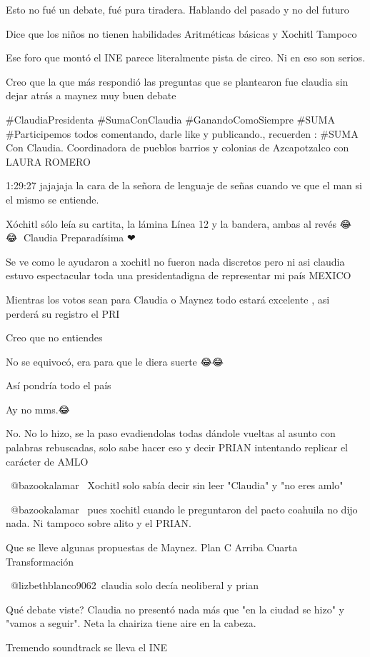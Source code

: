 Esto no fué un debate, fué pura tiradera. Hablando del pasado y no del futuro

Dice que los niños no tienen habilidades Aritméticas básicas y Xochitl Tampoco

Ese foro que montó el INE parece literalmente pista de circo.
Ni en eso son serios.

Creo que la que más respondió las preguntas que se plantearon fue claudia sin dejar atrás a maynez muy buen debate 👌🏻

#ClaudiaPresidenta 
#SumaConClaudia
#GanandoComoSiempre
#SUMA
#Participemos todos comentando, darle like y publicando., recuerden : #SUMA Con Claudia. 
Coordinadora de pueblos barrios y colonias de Azcapotzalco con LAURA ROMERO

1:29:27 jajajaja la cara de la señora de lenguaje de señas cuando ve que el man si el mismo se entiende.

Xóchitl sólo leía su cartita, la lámina Línea 12 y la bandera, ambas al revés 😂🤣😂🤣
Claudia Preparadísima ❤🔬🔭😍

Se ve como le ayudaron a xochitl  no fueron nada discretos pero ni asi claudia estuvo espectacular toda una presidentadigna de representar mi país MEXICO

Mientras los votos sean para Claudia o Maynez todo estará excelente , asi perderá su registro el PRI

Creo que no entiendes

No se equivocó, era para que le diera suerte 😂😂

Así pondría todo el país

Ay no mms.😂

No. No lo hizo, se la paso evadiendolas todas dándole vueltas al asunto con palabras rebuscadas, solo sabe hacer eso y decir PRIAN intentando replicar el carácter de AMLO

​ @bazookalamar  Xochitl solo sabía decir sin leer "Claudia" y "no eres amlo"

 @bazookalamar  pues xochitl cuando le preguntaron del pacto coahuila no dijo nada. Ni tampoco sobre alito y el PRIAN.

Que se lleve algunas propuestas de Maynez. 
Plan C
Arriba Cuarta Transformación

 @lizbethblanco9062 claudia solo decía neoliberal y prian 🤡

Qué debate viste? Claudia no presentó nada más que "en la ciudad se hizo" y "vamos a seguir". Neta la chairiza tiene aire en la cabeza.

Tremendo soundtrack se lleva el INE

